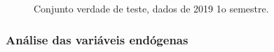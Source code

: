 \documentclass[	12pt, Times, openright, twoside, a4paper, english, brazil]{abntex2}
\begin{document}
                    \begin{figure}[!ht]
                    	\caption{Conjunto verdade de teste, dados de 2019 1o semestre. \label{fig:case1_test} }
                    \end{figure}
                    
    	    \subsubsection{Análise das variáveis endógenas}
\end{document}
